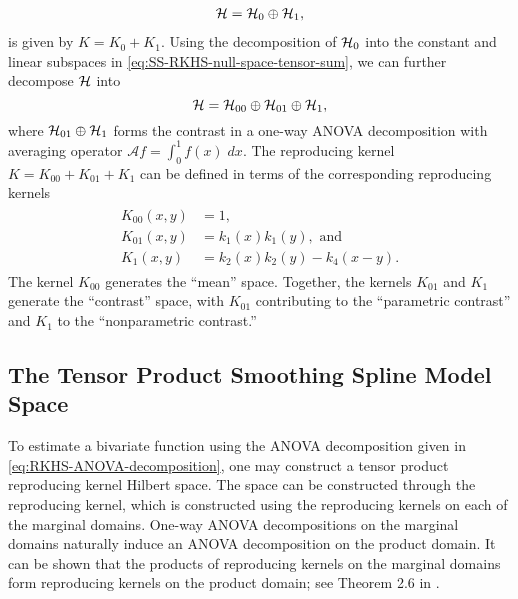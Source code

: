\begin{align}\label{eq:SS-RKHS-as-tensor-sum}
\mathcal{H} = \mathcal{H}_0  \oplus \mathcal{H}_1,
\end{align}
\noindent
is given by $K = K_0 + K_1$. Using the decomposition of $\mathcal{H}_0$ into the constant and linear subspaces in \eqref{eq:SS-RKHS-null-space-tensor-sum}, we can further decompose $\mathcal{H}$ into
\begin{equation}\label{eq:RKHS-ANOVA-decomposition}
\mathcal{H} = \mathcal{H}_{00}  \oplus  \mathcal{H}_{01} \oplus\mathcal{H}_1, 
\end{equation}
\noindent
where $ \mathcal{H}_{01} \oplus \mathcal{H}_1$ forms the contrast in a one-way ANOVA decomposition with averaging operator $\mathcal{A}f = \int_0^1 f\left(x\right)\;dx$. 
The reproducing kernel $K = K_{00} + K_{01} + K_1$ can be defined in terms of the corresponding reproducing kernels 
\begin{align}
\begin{split} \label{eq:cubic-spline-hilbert-space-rks}
K_{00}\left(x,y\right) &= 1,\\
K_{01}\left(x,y\right) &= k_1\left(x\right)k_1\left(y\right), \mbox{ and}\\
K_{1}\left(x,y\right) &= k_2\left(x\right)k_2\left(y\right) - k_4\left(x-y\right).
\end{split}
\end{align}
\noindent
The kernel $K_{00}$ generates the ``mean'' space. Together, the kernels $K_{01}$ and $K_{1}$ generate the ``contrast'' space, with $K_{01}$ contributing to the ``parametric contrast'' and $K_{1}$ to the ``nonparametric contrast.''

\subsection{The Tensor Product Smoothing Spline Model Space}

To estimate a bivariate function using the ANOVA decomposition given in \eqref{eq:RKHS-ANOVA-decomposition}, one may construct a tensor product reproducing kernel Hilbert space. The space can be constructed through the reproducing kernel, which is constructed using the reproducing kernels on each of the marginal domains. One-way ANOVA decompositions on the marginal domains naturally induce an ANOVA decomposition on the product domain. It can be shown that the products of reproducing kernels on the marginal domains form reproducing kernels on the product domain; see Theorem 2.6 in \cite{gu2013smoothing}.

